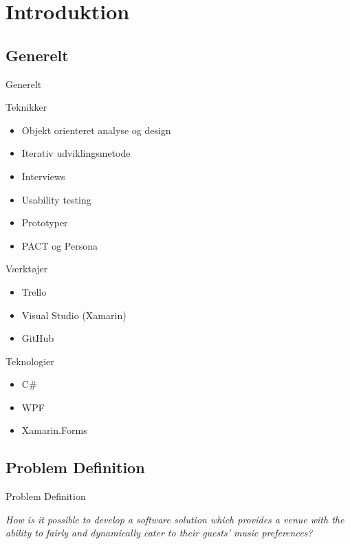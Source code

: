 \section{Introduktion}

\subsection{Generelt}
\begin{frame}{Generelt}
	\begin{multicols}{2}
		Teknikker
		\begin{itemize}
			\item Objekt orienteret analyse og design
			\item Iterativ udviklingsmetode
			\item Interviews
			\item Usability testing
			\item Prototyper
			\item PACT og Persona\newline
		\end{itemize}
		
		Værktøjer
		\begin{itemize}
			\item Trello
			\item Visual Studio (Xamarin)
			\item GitHub
		\end{itemize}
		
		\columnbreak
		
		Teknologier
		\begin{itemize}
			\item C\#
			\item WPF
			\item Xamarin.Forms
		\end{itemize}
	\end{multicols}
\end{frame}

\subsection{Problem Definition}
\begin{frame}{Problem Definition}
	\begin{center}
		\textit{How is it possible to develop a software solution which provides a venue with the ability to fairly and dynamically cater to their guests' music preferences?}
	\end{center}
\end{frame}

